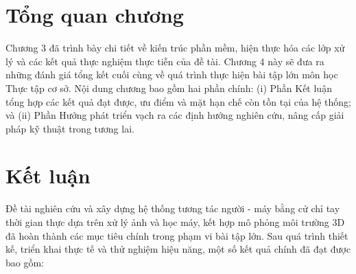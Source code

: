 \documentclass[../BTL.tex]{subfiles}
\begin{document}
\section*{Tổng quan chương}
Chương 3 đã trình bày chi tiết về kiến trúc phần mềm, hiện thực hóa các lớp xử lý và các kết quả thực nghiệm thực tiễn của đề tài. Chương 4 này sẽ đưa ra những đánh giá tổng kết cuối cùng về quá trình thực hiện bài tập lớn môn học Thực tập cơ sở. Nội dung chương bao gồm hai phần chính: (i) Phần Kết luận tổng hợp các kết quả đạt được, ưu điểm và mặt hạn chế còn tồn tại của hệ thống; và (ii) Phần Hướng phát triển vạch ra các định hướng nghiên cứu, nâng cấp giải pháp kỹ thuật trong tương lai.

\section{Kết luận}
\label{section:4.1}
Đề tài nghiên cứu và xây dựng hệ thống tương tác người - máy bằng cử chỉ tay thời gian thực dựa trên xử lý ảnh và học máy, kết hợp mô phỏng môi trường 3D đã hoàn thành các mục tiêu chính trong phạm vi bài tập lớn. Sau quá trình thiết kế, triển khai thực tế và thử nghiệm hiệu năng, một số kết quả chính đã đạt được bao gồm:
\end{document}
